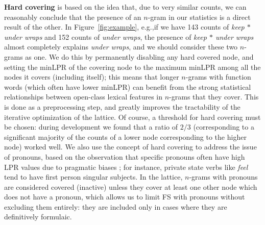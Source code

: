 \documentclass[11pt,letterpaper]{article}
\makeatletter
\def \eg {e.g.,\@ }
\newcommand{\gap}{$*$\xspace}
\newcommand{\ex}[1]{\textit{#1}\xspace}
\newcommand{\termdef}[1]{\textbf{#1}\xspace}
\newcommand{\figref}[2][]{Figure#1~\ref{#2}\xspace}
\makeatother
\begin{document}
\termdef{Hard covering} is based on the idea that, due to very similar counts, we can reasonably conclude that the presence of an $n$-gram in our statistics is a direct result of the other. In \figref{fig:example}, \eg if we have 143 counts of \ex{keep \gap under wraps} and 152 counts of \ex{under wraps}, the presence of \ex{keep \gap under wraps} almost completely explains \ex{under wraps}, and we should consider these two $n$-grams as one. We do this by permanently disabling any hard covered node, and setting the minLPR of the covering node to the maximum minLPR among all the nodes it covers (including itself); this means that longer $n$-grams with function words (which often have lower minLPR) can benefit from the strong statistical relationships between open-class lexical features in $n$-grams that they cover. This is done as a preprocessing step, and greatly improves the tractability of the iterative optimization of the lattice. Of course, a threshold for hard covering must be chosen: during development we found that a ratio of $2/3$ (corresponding to a significant majority of the counts of a lower node corresponding to the higher node) worked well.  We also use the concept of hard covering to address the issue of pronouns, based on the observation that specific pronouns often have high LPR values due to pragmatic biases \cite{Brooke15b}; for instance, private state verbs like \ex{feel} tend to have first person singular subjects. In the lattice, $n$-grams with pronouns are considered covered (inactive) unless they cover at least one other node which does not have a pronoun, which allows us to limit FS with pronouns without excluding them entirely: they are included only in cases where they are definitively formulaic. 
\end{document}
